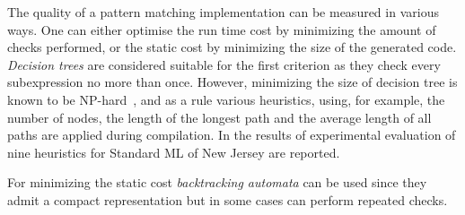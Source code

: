 \begin{comment}
\begin{figure}[ht]
\begin{minipage}[b]{0.3\linewidth}
\centering
\label{fig:figure1}
\end{minipage}
\hspace{0.5cm}
\begin{minipage}[b]{0.3\linewidth}
\centering
\begin{lstlisting}
switch x with 
| true -> 
    switch y with 
    | true -> 
       switch z with 
       | true -> 4
       | _ -> 3
    | _ -> 
      switch z with 
      | true -> 1
      | _ -> 3 
| _ -> 
   switch y with 
   | true -> 2 
   | _ -> if z then 1 else 3
\end{lstlisting}
\end{minipage}
\hspace{0.5cm}
\begin{minipage}[b]{0.3\linewidth}
\centering
\end{minipage}
\end{figure}
\end{comment}



The quality of a pattern matching implementation can be measured in various ways. One can either optimise the run time cost by minimizing the amount of checks performed, or the static
cost by minimizing the size of the generated code. \emph{Decision trees}
are considered suitable for the first criterion as they check every subexpression no more than once.
However, minimizing the size of decision tree is known to be NP-hard~\cite{baudinet1985tree}, and as a rule various heuristics, using, for example,
the number of nodes, the length of the longest path and the average length of all paths are applied during compilation. In \cite{Scott2000WhenDM} the results of experimental
evaluation of nine heuristics for Standard ML of New Jersey are reported.

For minimizing the static cost \emph{backtracking automata} can be used since they admit a compact representation but in some cases can perform repeated checks.


